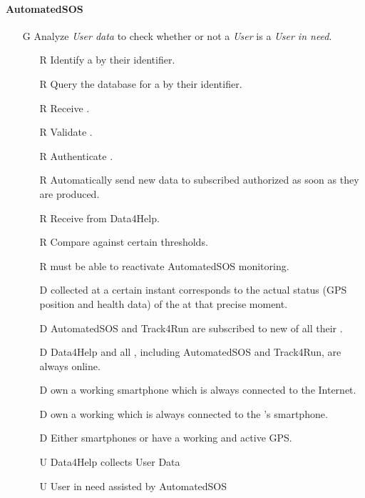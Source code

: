 \documentclass[../../../rasd.tex]{subfiles}
\begin{document}
\paragraph{AutomatedSOS}
\begin{itemize}
	\item[G\subs{6}]Analyze \textit{User data} to check whether or not a \textit{User} is a \textit{User in need}.
	\begin{itemize}
		\item[R\subs{6}]Identify a  by their identifier.
		\item[R\subs{7}]Query the database for a  by their identifier.
		\item[R\subs{8}]Receive .
		\item[R\subs{9}]Validate .
		\item[R\subs{10}]Authenticate .
		\item[R\subs{29}]Automatically send new data to subscribed authorized  as soon as they are produced.
		\item[R\subs{36}]Receive  from Data4Help.
		\item[R\subs{37}]Compare  against certain thresholds.
		\item[R\subs{39}] must be able to reactivate AutomatedSOS monitoring.
		\\
		\item[D\subs{2}] collected at a certain instant corresponds to the actual status (GPS position and health data) of the  at that precise moment.              
		\item[D\subs{6}]AutomatedSOS and Track4Run are subscribed to new  of all their .
		\item[D\subs{9}]Data4Help and all , including AutomatedSOS and Track4Run, are always online.
		\item[D\subs{10}] own a working smartphone which is always connected to the Internet.
		\item[D\subs{11}] own a working  which is always connected to the 's smartphone.
		\item[D\subs{12}]Either smartphones or  have a working and active GPS.
		\\
		\item[U\subs{5}]Data4Help collects User Data
		\item[U\subs{12}]User in need assisted by AutomatedSOS
	\end{itemize}


\end{itemize}
\end{document}

